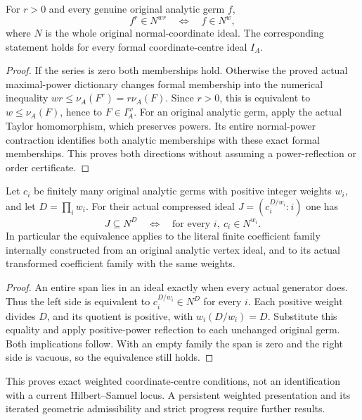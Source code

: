 \begin{theorem}
\label{hir:actual-normal-coordinate-power-reflection}
\leanok
For $r>0$ and every genuine original analytic germ $f$,
\[
 f^r\in N^{wr}\quad\Longleftrightarrow\quad f\in N^w,
\]
where $N$ is the whole original normal-coordinate ideal. The corresponding
statement holds for every formal coordinate-centre ideal $I_A$.
\end{theorem}
\begin{proof}
If the series is zero both memberships hold. Otherwise the proved actual
maximal-power dictionary changes formal membership into the numerical
inequality $wr\le\nu_A(F^r)=r\nu_A(F)$. Since $r>0$, this is equivalent to
$w\le\nu_A(F)$, hence to $F\in I_A^w$. For an original analytic germ, apply
the actual Taylor homomorphism, which preserves powers. Its entire normal-power
contraction identifies both analytic memberships with these exact formal
memberships. This proves both directions without assuming a power-reflection
or order certificate.
\end{proof}

\begin{theorem}
\label{hir:actual-weighted-compression-exact-centre-admissibility}
\leanok
Let $c_i$ be finitely many original analytic germs with positive integer weights
$w_i$, and let $D=\prod_iw_i$. For their actual compressed ideal
$J=(c_i^{D/w_i}:i)$ one has
\[
 J\subseteq N^D\quad\Longleftrightarrow\quad
 \text{for every }i,\ c_i\in N^{w_i}.
\]
In particular the equivalence applies to the literal finite coefficient family
internally constructed from an original analytic vertex ideal, and to its
actual transformed coefficient family with the same weights.
\end{theorem}
\begin{proof}
An entire span lies in an ideal exactly when every actual generator does.
Thus the left side is equivalent to $c_i^{D/w_i}\in N^D$ for every $i$.
Each positive weight divides $D$, and its quotient is positive, with
$w_i(D/w_i)=D$. Substitute this equality and apply positive-power reflection
to each unchanged original germ. Both implications follow. With an empty
family the span is zero and the right side is vacuous, so the equivalence still
holds.
\end{proof}

This proves exact weighted coordinate-centre conditions, not an identification
with a current Hilbert--Samuel locus. A persistent weighted presentation and its
iterated geometric admissibility and strict progress require further results.
